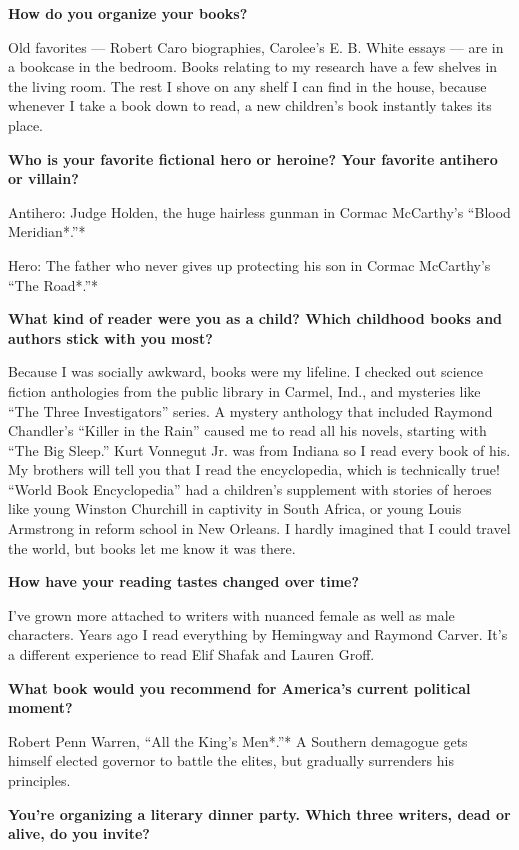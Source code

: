 \textbf{How do you organize your books?}

Old favorites --- Robert Caro biographies, Carolee's E. B. White essays
--- are in a bookcase in the bedroom. Books relating to my research have
a few shelves in the living room. The rest I shove on any shelf I can
find in the house, because whenever I take a book down to read, a new
children's book instantly takes its place.

\textbf{Who is your favorite fictional hero or heroine? Your favorite
antihero or villain?}

Antihero: Judge Holden, the huge hairless gunman in Cormac McCarthy's
``Blood Meridian*.''*

Hero: The father who never gives up protecting his son in Cormac
McCarthy's ``The Road*.''*

\textbf{What kind of reader were you as a child? Which childhood books
and authors stick with you most?}

Because I was socially awkward, books were my lifeline. I checked out
science fiction anthologies from the public library in Carmel, Ind., and
mysteries like ``The Three Investigators'' series. A mystery anthology
that included Raymond Chandler's ``Killer in the Rain'' caused me to
read all his novels, starting with ``The Big Sleep.'' Kurt Vonnegut Jr.
was from Indiana so I read every book of his. My brothers will tell you
that I read the encyclopedia, which is technically true! ``World Book
Encyclopedia'' had a children's supplement with stories of heroes like
young Winston Churchill in captivity in South Africa, or young Louis
Armstrong in reform school in New Orleans. I hardly imagined that I
could travel the world, but books let me know it was there.

\textbf{How have your reading tastes changed over time?}

I've grown more attached to writers with nuanced female as well as male
characters. Years ago I read everything by Hemingway and Raymond Carver.
It's a different experience to read Elif Shafak and Lauren Groff.

\textbf{What book would you recommend for America's current political
moment?}

Robert Penn Warren, ``All the King's Men*.''* A Southern demagogue gets
himself elected governor to battle the elites, but gradually surrenders
his principles.

\textbf{You're organizing a literary dinner party. Which three writers,
dead or alive, do you invite?}

